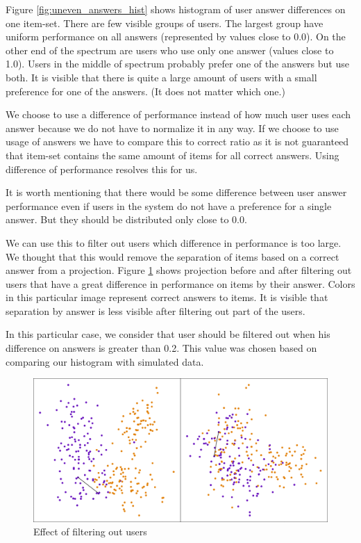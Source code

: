 \documentclass[
  digital, %
  table,   %
  nolof,     %
  nolot,     %
  nocover,
  color,
  final, %
]{fithesis3}
\begin{document}
Figure \ref{fig:uneven_answers_hist} shows histogram of user answer differences on one item-set. There are few visible groups of users. The largest group have uniform performance on all answers (represented by values close to 0.0). On the other end of the spectrum are users who use only one answer (values close to 1.0). Users in the middle of spectrum probably prefer one of the answers but use both. It is visible that there is quite a large amount of users with a small preference for one of the answers. (It does not matter which one.)


We choose to use a difference of performance instead of how much user uses each answer because we do not have to normalize it in any way. If we choose to use usage of answers we have to compare this to correct ratio as it is not guaranteed that item-set contains the same amount of items for all correct answers. Using difference of performance resolves this for us.


It is worth mentioning that there would be some difference between user answer performance even if users in the system do not have a preference for a single answer. But they should be distributed only close to 0.0.

We can use this to filter out users which difference in performance is too large. We thought that this would remove the separation of items based on a correct answer from a projection. Figure \ref{fig:answers_normalization} shows projection before and after filtering out users that have a great difference in performance on items by their answer. Colors in this particular image represent correct answers to items. It is visible that separation by answer is less visible after filtering out part of the users.

In this particular case, we consider that user should be filtered out when his difference on answers is greater than 0.2. This value was chosen based on comparing our histogram with simulated data.

\begin{figure}
  \includegraphics[width=\textwidth]{img/answers_normalization}
  \caption{Effect of filtering out users}
  \label{fig:answers_normalization}
\end{figure}
\end{document}
